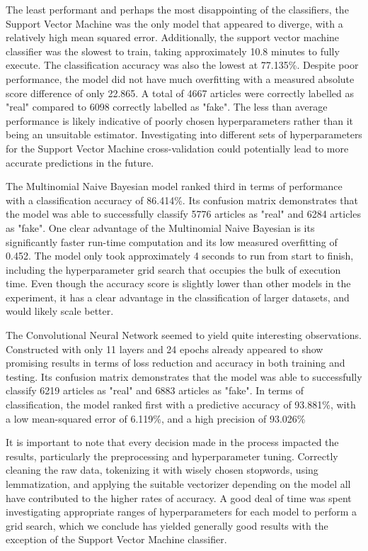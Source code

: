 \documentclass[10pt,twocolumn,letterpaper]{article}
\begin{document}
The least performant and perhaps the most disappointing of the classifiers, the Support Vector Machine was the only model that appeared to diverge, with a relatively high mean squared error. Additionally, the support vector machine classifier was the slowest to train, taking approximately 10.8 minutes to fully execute. The classification accuracy was also the lowest at 77.135\%. Despite poor performance, the model did not have much overfitting with a measured absolute score difference of only 22.865. A total of 4667 articles were correctly labelled as "real" compared to 6098 correctly labelled as "fake". The less than average performance is likely indicative of poorly chosen hyperparameters rather than it being an unsuitable estimator. Investigating into different sets of hyperparameters for the Support Vector Machine cross-validation could potentially lead to more accurate predictions in the future.\par

The Multinomial Naive Bayesian model ranked third in terms of performance with a classification accuracy of 86.414\%. Its confusion matrix demonstrates that the model was able to successfully classify 5776 articles as "real" and 6284 articles as "fake". One clear advantage of the Multinomial Naive Bayesian is its significantly faster run-time computation and its low measured overfitting of 0.452. The model only took approximately 4 seconds to run from start to finish, including the hyperparameter grid search that occupies the bulk of execution time. Even though the accuracy score is slightly lower than other models in the experiment, it has a clear advantage in the classification of larger datasets, and would likely scale better. \par

The Convolutional Neural Network seemed to yield quite interesting observations. Constructed with only 11 layers and 24 epochs already appeared to show promising results in terms of loss reduction and accuracy in both training and testing. Its confusion matrix demonstrates that the model was able to successfully classify 6219 articles as "real" and 6883 articles as "fake". In terms of classification, the model ranked first with a predictive accuracy of 93.881\%, with a low mean-squared error of 6.119\%, and a high precision of 93.026\%\par

It is important to note that every decision made in the process impacted the results, particularly the preprocessing and hyperparameter tuning. Correctly cleaning the raw data, tokenizing it with wisely chosen stopwords, using lemmatization, and applying the suitable vectorizer depending on the model all have contributed to the higher rates of accuracy. A good deal of time was spent investigating appropriate ranges of hyperparameters for each model to perform a grid search, which we conclude has yielded generally good results with the exception of the Support Vector Machine classifier.
\end{document}
